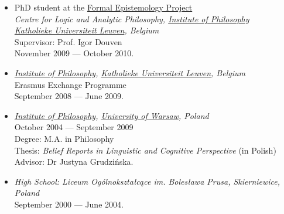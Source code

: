 \documentclass[a4paper,12pt]{article}
\begin{document}
\begin{small}
\begin{itemize}
  \item PhD student at the  \href{http://formalphilosophy.org/}{Formal Epistemology Project}\\
    \emph{Centre for Logic and Analytic Philosophy, \href{http://hiw.kuleuven.be/eng/}{Institute of Philosophy}\\
      \href{http://www.kuleuven.be/english}{Katholieke Universiteit Leuven}, Belgium}\\
    Supervisor: Prof. Igor Douven\\
    November 2009 --- October 2010.

  \end{itemize}



  
  \begin{itemize}
  \item \emph{\href{http://hiw.kuleuven.be/eng/}{Institute of Philosophy}, \href{http://www.kuleuven.be}{Katholieke Universiteit Leuven}, Belgium}\\
    Erasmus Exchange Programme\\
    September 2008 --- June 2009.
    
  \item \emph{\href{http://www.filozofia.uw.edu.pl}{Institute of
         Philosophy}, \href{http://www.uw.edu.pl}{University of Warsaw}, Poland}\\
    October 2004 --- September 2009\\
    Degree: M.A. in Philosophy\\
    Thesis: \emph{Belief Reports in Linguistic and Cognitive
      Perspective} (in Polish)\\
    Advisor: Dr Justyna Grudzińska.
    
  \item \emph{High School: Liceum Ogólnokształcące im. Bolesława
      Prusa, Skierniewice, Poland}\\
    September 2000 --- June 2004.


\end{itemize}
\end{small}
\end{document}
